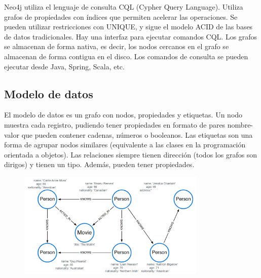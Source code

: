 Neo4j utiliza el lenguaje de consulta CQL (Cypher Query Language). Utiliza grafos de propiedades con índices que permiten acelerar las operaciones. Se pueden utilizar restricciones con UNIQUE, y sigue el modelo ACID de las bases de datos tradicionales. Hay una interfaz para ejecutar comandos CQL. Los grafos se almacenan de forma nativa, es decir, los nodos cercanos en el grafo se almacenan de forma contigua en el disco. Los comandos de consulta se pueden ejecutar desde Java, Spring, Scala, etc. 

\subsection{Modelo de datos}
El modelo de datos es un grafo con nodos, propiedades y etiquetas. Un nodo muestra cada registro, pudiendo tener propiedades en formato de pares nombre-valor que pueden contener cadenas, números o booleanos. Las etiquetas son una forma de agrupar nodos similares (equivalente a las clases en la programación orientada a objetos). Las relaciones siempre tienen dirección (todos los grafos son dirigos) y tienen un tipo. Además, pueden tener propiedades. 

\begin{figure}[htbp]
\centering
\includegraphics[width = 0.8\textwidth]{figs/neo4j-graph.png}
\end{figure}

